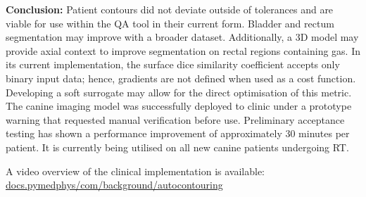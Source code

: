 \textbf{Conclusion:}
Patient contours did not deviate outside of tolerances and are viable for use
within the QA tool in their current form. Bladder and rectum segmentation may
improve with a broader dataset. Additionally, a 3D model may provide axial
context to improve segmentation on rectal regions containing gas. In its current
implementation, the surface dice similarity coefficient accepts only binary
input data; hence, gradients are not defined when used as a cost function.
Developing a soft surrogate may allow for the direct optimisation of this
metric. The canine imaging model was successfully deployed to clinic under a
prototype warning that requested manual verification before use. Preliminary
acceptance testing has shown a performance improvement of approximately 30
minutes per patient. It is currently being utilised on all new canine patients
undergoing RT.

A video overview of the clinical implementation is available:\\
\href{https://docs.pymedphys.com/background/autocontouring.html}{docs.pymedphys/com/background/autocontouring}